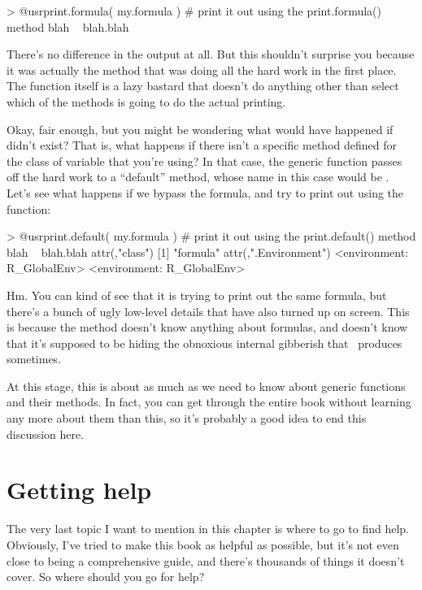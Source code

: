 \begin{rblock1}
> @usr{print.formula( my.formula )}       # print it out using the print.formula() method
blah ~ blah.blah
\end{rblock1}
There's no difference in the output at all. But this shouldn't surprise you because it was actually the  method that was doing all the hard work in the first place. The  function itself is a lazy bastard that doesn't do anything other than select which of the methods is going to do the actual printing. 

Okay, fair enough, but you might be wondering what would have happened if  didn't exist? That is, what happens if there isn't a specific method defined for the class of variable that you're using? In that case, the generic function passes off the hard work to a ``default'' method, whose name in this case would be . Let's see what happens if we bypass the  formula, and try to print out  using the   function:
\begin{rblock1}
> @usr{print.default( my.formula )}      # print it out using the print.default() method
blah ~ blah.blah
attr(,"class")
[1] "formula"
attr(,".Environment")
<environment: R_GlobalEnv>
<environment: R_GlobalEnv>
\end{rblock1}
Hm. You can kind of see that it is trying to print out the same formula, but there's a bunch of ugly low-level details that have also turned up on screen. This is because the  method doesn't know anything about formulas, and doesn't know that it's supposed to be hiding the obnoxious internal gibberish that \R\ produces sometimes. 

At this stage, this is about as much as we need to know about generic functions and their methods. In fact, you can get through the entire book without learning any more about them than this, so it's probably a good idea to end this discussion here.

\section{Getting help~\label{sec:help}}

The very last topic I want to mention in this chapter is where to go to find help. Obviously, I've tried to make this book as helpful as possible, but it's not even close to being a comprehensive guide, and there's thousands of things it doesn't cover. So where should you go for help? 

